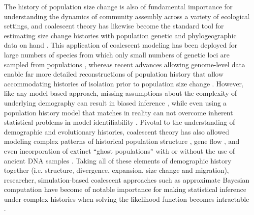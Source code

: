\documentclass[12pt]{article}
\begin{document}
The history of population size change is also of fundamental
importance for understanding the dynamics of community assembly across
a variety of ecological settings, and coalescent theory has likewise
become the standard tool for estimating size change histories with
population genetic and phylogeographic data on hand
\cite{Kuhner1998-dp, Slatkin1991-ec}. This application of coalescent
modeling has been deployed for large numbers of species from which
only small numbers of genetic loci are sampled from populations
\cite{Drummond2005-zh}, whereas recent advances allowing genome-level
data enable far more detailed reconstructions of population history
\cite{Schiffels2014-rv, Boitard2016-zw} that allow accommodating
histories of isolation prior to population size change
\cite{Terhorst2016-wl}. However, like any model-based approach,
missing assumptions about the complexity of underlying demography can
result in biased inference \cite{Mazet2015-iy}, while even using a
population history model that matches in reality can not overcome
inherent statistical problems in model identifiability
\cite{Terhorst2015-mt}. Pivotal to the understanding of demographic
and evolutionary histories, coalescent theory has also allowed
modeling complex patterns of historical population structure
\cite{Prado-Martinez2013-hv, Bahlo2000-cx}, gene flow
\cite{Beerli2001-mt,Hey2004-xe}, and even incorporation of extinct
``ghost populations'' \cite{Slatkin2005-rb, Alter2007-hk} with or
without the use of ancient DNA samples \cite{Kuhlwilm2016-vf,
  Veeramah2014-fg}. Taking all of these elements of demographic
history together (i.e. structure, divergence, expansion, size change
and migration), researcher, simulation-based coalescent approaches
such as approximate Bayesian computation \cite{Beaumont2010-to,
  Pritchard1999-zf} have become of notable importance for making
statistical inference under complex histories when solving the
likelihood function becomes intractable \cite{Sunnaker2013-ts}.
\end{document}
